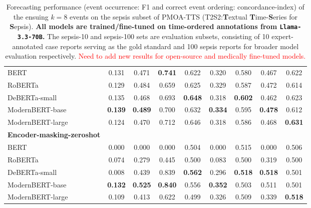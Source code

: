 \begin{table}[htb!]
{\begin{tabular}{lcccccccc}
BERT & 0.131 & 0.471 & \textbf{0.741} & 0.622 & 0.320 & 0.580 & 0.467 & 0.622 \\
RoBERTa & 0.129 & 0.484 & 0.659 & 0.625 & 0.329 & 0.587 & 0.472 & 0.614 \\
DeBERTa-small & 0.135 & 0.468 & 0.693 & \textbf{0.648} & 0.318 & \textbf{0.602} & 0.462 & 0.623 \\
ModernBERT-base & \textbf{0.139} & \textbf{0.489} & 0.700 & 0.632 & \textbf{0.334} & 0.595 & \textbf{0.478} & 0.612 \\
ModernBERT-large & 0.124 & 0.470 & 0.712 & 0.646 & 0.318 & 0.586 & 0.468 & \textbf{0.631} \\
\midrule
\textbf{Encoder-masking-zeroshot} &&&&&&&&\\
BERT & 0.000 & 0.000 & 0.000 & 0.504 & 0.000 & 0.515 & 0.000 & 0.506 \\
RoBERTa & 0.074 & 0.279 & 0.445 & 0.500 & 0.083 & 0.500 & 0.319 & 0.500 \\
DeBERTa-small & 0.008 & 0.439 & 0.839 & \textbf{0.562} & 0.296 & \textbf{0.518} & \textbf{0.518} & 0.501 \\
ModernBERT-base & \textbf{0.132} & \textbf{0.525} & \textbf{0.840} & 0.556 & \textbf{0.352} & 0.503 & 0.511 & 0.501 \\
ModernBERT-large & 0.109 & 0.413 & 0.622 & 0.499 & 0.326 & 0.509 & 0.339 & \textbf{0.518} \\
\bottomrule
\end{tabular}
}
\caption{Forecasting performance (event occurrence: F1 and correct event ordering: concordance-index) of the ensuing $k=8$ events on the sepsis subset of PMOA-TTS (T2S2:\textbf{T}extual \textbf{T}ime-\textbf{S}eries for \textbf{S}epsis). \textbf{All models are trained/fine-tuned on time-ordered annotations from \texttt{Llama-3.3-70B}.} The sepsis-10 and sepsis-100 sets are evaluation subsets, consisting of 10 expert-annotated case reports serving as the gold standard and 100 sepsis reports for broader model evaluation respectively. \textcolor{red}{Need to add new results for open-source and medically fine-tuned models.}}
\label{L33_forecasting}
\vspace{-2em}
\end{table}
